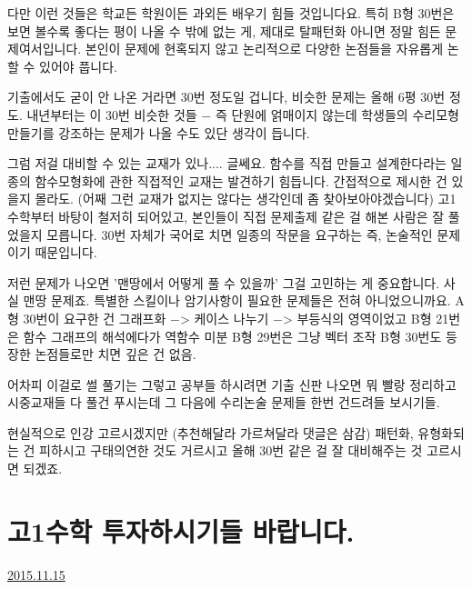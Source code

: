 다만 이런 것들은 학교든 학원이든 과외든 배우기 힘들 것입니다요.
특히 B형 30번은 보면 볼수록 좋다는 평이 나올 수 밖에 없는 게, 제대로 탈패턴화 아니면 정말 힘든 문제여서입니다.
본인이 문제에 현혹되지 않고 논리적으로 다양한 논점들을 자유롭게 논할 수 있어야 풉니다.
\vspace{5mm}

기출에서도 굳이 안 나온 거라면 30번 정도일 겁니다, 비슷한 문제는 올해 6평 30번 정도.
내년부터는 이 30번 비슷한 것들 $-$ 즉 단원에 얽매이지 않는데 학생들의 수리모형 만들기를 강조하는 문제가 나올 수도 있단 생각이 듭니다.
\vspace{5mm}

그럼 저걸 대비할 수 있는 교재가 있나.... 글쎄요.
함수를 직접 만들고 설계한다라는 일종의 함수모형화에 관한 직접적인 교재는 발견하기 힘듭니다. 간접적으로 제시한 건 있을지 몰라도.
(어째 그런 교재가 없지는 않다는 생각인데 좀 찾아보아야겠습니다)
고1 수학부터 바탕이 철저히 되어있고, 본인들이 직접 문제출제 같은 걸 해본 사람은 잘 풀었을지 모릅니다.
30번 자체가 국어로 치면 일종의 작문을 요구하는 즉, 논술적인 문제이기 때문입니다.
\vspace{5mm}

저런 문제가 나오면 '맨땅에서 어떻게 풀 수 있을까' 그걸 고민하는 게 중요합니다.
사실 맨땅 문제죠. 특별한 스킬이나 암기사항이 필요한 문제들은 전혀 아니었으니까요.
A형 30번이 요구한 건 그래프화 $-$> 케이스 나누기 $-$> 부등식의 영역이었고
B형 21번은 함수 그래프의 해석에다가 역함수 미분
B형 29번은 그냥 벡터 조작
B형 30번도 등장한 논점들로만 치면 깊은 건 없음.
\vspace{5mm}

어차피 이걸로 썰 풀기는 그렇고
공부들 하시려면 기출 신판 나오면 뭐 빨랑 정리하고
시중교재들 다 풀건 푸시는데
그 다음에 수리논술 문제들 한번 건드려들 보시기들.
\vspace{5mm}

현실적으로 인강 고르시겠지만 (추천해달라 가르쳐달라 댓글은 삼감)
패턴화, 유형화되는 건 피하시고 구태의연한 것도 거르시고 올해 30번 같은 걸 잘 대비해주는 것 고르시면 되겠죠.
\vspace{5mm}






\section{고1수학 투자하시기들 바랍니다.}
\href{https://www.kockoc.com/Apoc/490501}{2015.11.15}

\vspace{5mm}

